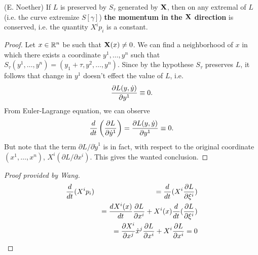 \begin{theorem}
	(E. Noether) If $L$ is preserved by $S_{\tau}$ generated by $\mathbf{X}$, then on any extremal of $L$ (i.e. the curve extremize $S[\gamma]$) \textbf{the momentum in the $\mathbf{X}$ direction} is conserved, i.e. the quantity $X^ip_i$ is a constant.
	\label{thm:noether_inv}
\end{theorem}
\begin{proof}
	Let $x \in \mathbb{R}^n$ be such that $\mathbf{X}(x) \neq 0$. We can find a neighborhood of $x$ in which there exists a coordinate $y^1, \dots, y^n$ such that $S_{\tau}(y^1, \dots, y^n) = (y_1 + \tau, y^2, \dots, y^n)$. Since by the hypothese $S_{\tau}$ preserves $L$, it follows that change in $y^1$ doesn't effect the value of $L$, i.e. \[ \frac{ \partial L(y, \dot{y})}{ \partial y^1 } \equiv 0. \] From Euler-Lagrange equation, we can observe \[ \frac{d^{}  }{d t^{}} \left( \frac{ \partial L}{ \partial \dot{y}^1 } \right) = \frac{ \partial L(y, \dot{y})}{ \partial y^1 } \equiv 0. \] But note that the term $\partial L/ \partial \dot{y}^1$ is in fact, with respect to the original coordinate $(x^1, \dots, x^n)$, $X^i(\partial L/ \partial x^i)$. This gives the wanted conclusion.
\end{proof}
\begin{proof}[Proof provided by Wang]
	\begin{eqnarray}
		\frac{d^{}  }{d t^{}} (X^i p_i) &&= \frac{d^{}  }{d t^{}} (X^i \frac{ \partial L}{ \partial \xi^i })
		\nonumber\\
		&&=\frac{d^{} X^i(x)}{d t^{}} \frac{ \partial L}{ \partial x^i } + X^i(x) \frac{d^{}  }{d t^{}} (\frac{ \partial L}{ \partial \xi^i })
		\nonumber\\
		&&=\frac{ \partial X^i}{ \partial x^j } \dot{x}^j \frac{ \partial L}{ \partial x^i } + X^i \frac{ \partial L}{ \partial x^i } = 0
		\nonumber
	\end{eqnarray}
\end{proof}

